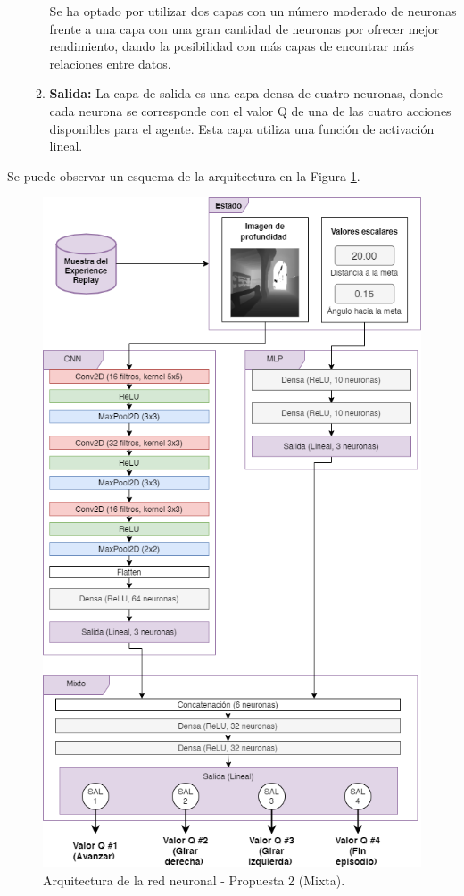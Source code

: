 \begin{itemize}
\begin{enumerate}
Se ha optado por utilizar dos capas con un número moderado de neuronas frente a una capa con una gran cantidad de neuronas por ofrecer mejor rendimiento, dando la posibilidad con más capas de encontrar más relaciones entre datos.
\item \textbf{Salida:} La capa de salida es una capa densa de cuatro neuronas, donde cada neurona se corresponde con el valor Q de una de las cuatro acciones disponibles para el agente. Esta capa utiliza una función de activación lineal.
\end{enumerate}

\end{itemize}

Se puede observar un esquema de la arquitectura en la Figura \ref{fig:chap5-arc2}.

\begin{figure}
    \centering
    \includegraphics[height=0.95\textheight]{imagenes/cap5/arquitectura2.png}
    \caption{Arquitectura de la red neuronal - Propuesta 2 (Mixta).}
    \label{fig:chap5-arc2}
\end{figure}	

